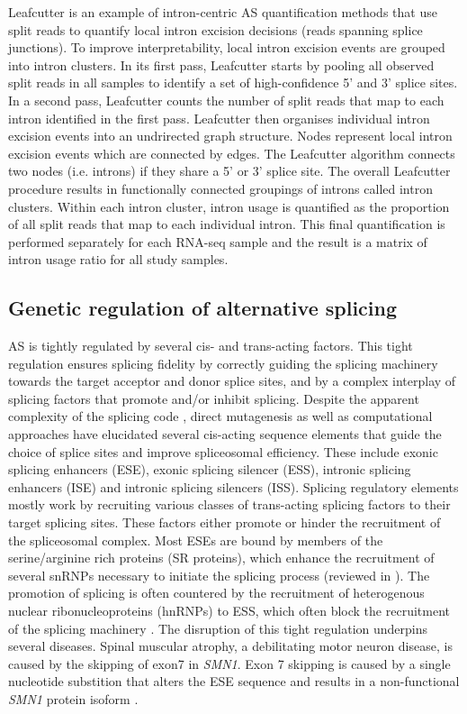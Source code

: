 Leafcutter is an example of intron-centric AS quantification methods that use split reads to quantify local intron excision decisions (reads spanning splice junctions). To improve interpretability, local intron excision events are grouped into intron clusters. In its first pass, Leafcutter starts by pooling all observed split reads in all samples to identify a set of high-confidence 5' and 3' splice sites. In a second pass, Leafcutter counts the number of split reads that map to each intron identified in the first pass. Leafcutter then organises individual intron excision events into an undrirected graph structure. Nodes represent local intron excision events which are connected by edges. The Leafcutter algorithm connects two nodes (i.e. introns) if they share a 5' or 3' splice site. The overall Leafcutter procedure results in functionally connected groupings of introns called intron clusters. Within each intron cluster, intron usage is quantified as the proportion of all split reads that map to each individual intron. This final quantification is performed separately for each RNA-seq sample and the result is a matrix of intron usage ratio for all study samples. 

\subsection{Genetic regulation of alternative splicing}
AS is tightly regulated by several cis- and trans-acting factors. This tight regulation ensures splicing fidelity by correctly guiding the splicing machinery towards the target acceptor and donor splice sites, and by a complex interplay of splicing factors that promote and/or inhibit splicing. Despite the apparent complexity of the splicing code \cite{Jaganathan2019-ah}, direct mutagenesis as well as computational approaches have elucidated several cis-acting sequence elements that guide the choice of splice sites and improve spliceosomal efficiency. These include exonic splicing enhancers (ESE), exonic splicing silencer (ESS), intronic splicing enhancers (ISE) and intronic splicing silencers (ISS). Splicing regulatory elements mostly work by recruiting various classes of trans-acting splicing factors to their target splicing sites. These factors either promote or hinder the recruitment of the spliceosomal complex. Most ESEs are bound by members of the serine/arginine rich proteins (SR proteins), which enhance the recruitment of several snRNPs necessary to initiate the splicing process (reviewed in \cite{Shepard2009-os}). The promotion of splicing is often countered by the recruitment of heterogenous nuclear ribonucleoproteins (hnRNPs) to ESS, which often block the recruitment of the splicing machinery \cite{Geuens2016-yz}. The disruption of this tight regulation underpins several diseases. Spinal muscular atrophy, a debilitating motor neuron disease, is caused by the skipping of exon7 in \textit{SMN1}. Exon 7 skipping is caused by a single nucleotide substition that alters the ESE sequence and results in a non-functional \textit{SMN1} protein isoform \cite{Monani1999-vf}.\\

